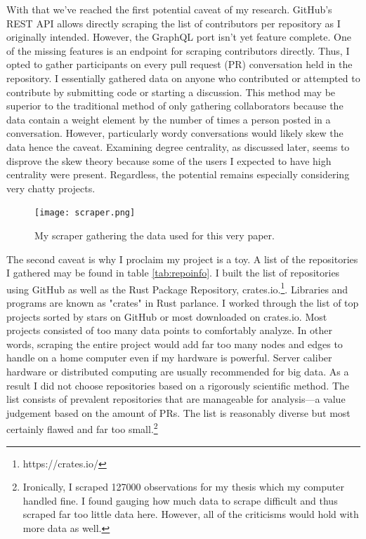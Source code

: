 \documentclass[12pt, a4paper]{article}
\begin{document}
With that we've reached the first potential caveat of my research. GitHub's REST API allows directly scraping the list of contributors per repository as I originally intended. However, the GraphQL port isn't yet feature complete. One of the missing features is an endpoint for scraping contributors directly. Thus, I opted to gather participants on every pull request (PR) conversation held in the repository. I essentially gathered data on anyone who contributed or attempted to contribute by submitting code or starting a discussion. This method may be superior to the traditional method of only gathering collaborators because the data contain a weight element by the number of times a person posted in a conversation. However, particularly wordy conversations would likely skew the data hence the caveat. Examining degree centrality, as discussed later, seems to disprove the skew theory because some of the users I expected to have high centrality were present. Regardless, the potential remains especially considering very chatty projects.

\begin{figure}[ht!]
    \texttt{[image: scraper.png]}
    \caption{My scraper gathering the data used for this very paper.}
    \label{fig:scraper}
\end{figure}

The second caveat is why I proclaim my project is a toy. A list of the repositories I gathered may be found in table \ref{tab:repoinfo}. I built the list of repositories using GitHub as well as the Rust Package Repository, crates.io.\footnote{https://crates.io/}. Libraries and programs are known as "crates" in Rust parlance. I worked through the list of top projects sorted by stars on GitHub or most downloaded on crates.io. Most projects consisted of too many data points to comfortably analyze. In other words, scraping the entire project would add far too many nodes and edges to handle on a home computer even if my hardware is powerful. Server caliber hardware or distributed computing are usually recommended for big data. As a result I did not choose repositories based on a rigorously scientific method. The list consists of prevalent repositories that are manageable for analysis---a value judgement based on the amount of PRs. The list is reasonably diverse but most certainly flawed and far too small.\footnote{Ironically, I scraped 127000 observations for my thesis which my computer handled fine. I found gauging how much data to scrape difficult and thus scraped far too little data here. However, all of the criticisms would hold with more data as well.}
\end{document}
